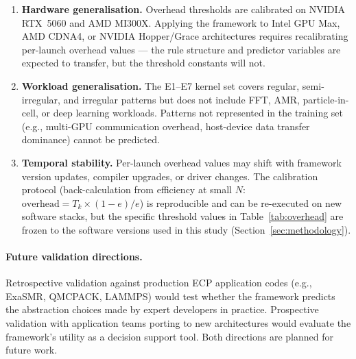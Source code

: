 \begin{enumerate}
    \item \textbf{Hardware generalisation.} Overhead thresholds are
    calibrated on NVIDIA RTX~5060 and AMD MI300X. Applying the framework
    to Intel GPU Max, AMD CDNA4, or NVIDIA Hopper/Grace architectures
    requires recalibrating per-launch overhead values --- the rule
    structure and predictor variables are expected to transfer, but
    the threshold constants will not.

    \item \textbf{Workload generalisation.} The E1--E7 kernel set covers
    regular, semi-irregular, and irregular patterns but does not include
    FFT, AMR, particle-in-cell, or deep learning workloads. Patterns not
    represented in the training set (e.g., multi-GPU communication
    overhead, host-device data transfer dominance) cannot be predicted.

    \item \textbf{Temporal stability.} Per-launch overhead values may
    shift with framework version updates, compiler upgrades, or driver
    changes. The calibration protocol (back-calculation from efficiency
    at small $N$: $\text{overhead} = T_k \times (1 - e) / e$) is
    reproducible and can be re-executed on new software stacks, but the
    specific threshold values in Table~\ref{tab:overhead} are frozen to
    the software versions used in this study
    (Section~\ref{sec:methodology}).
\end{enumerate}

\paragraph{Future validation directions.}
Retrospective validation against production ECP application codes
(e.g., ExaSMR, QMCPACK, LAMMPS) would test whether the framework
predicts the abstraction choices made by expert developers in practice.
Prospective validation with application teams porting to new
architectures would evaluate the framework's utility as a decision
support tool. Both directions are planned for future work.
